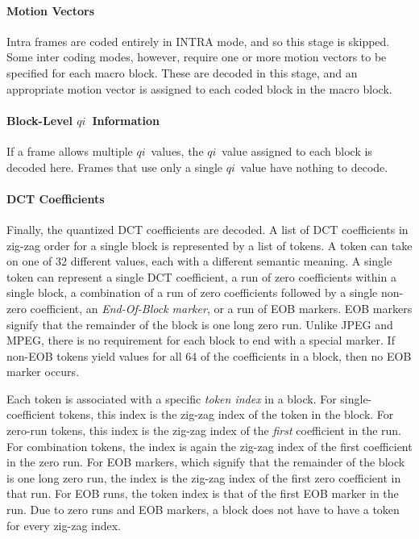 \documentclass[11pt,letterpaper]{book}
\newcommand{\idx}[1]{{\ensuremath{\mathit{#1}}}}
\newcommand{\qi}{\idx{qi}}
\newcommand{\term}[1]{{\em #1}}
\numberwithin{equation}{chapter}
\numberwithin{figure}{chapter}
\numberwithin{table}{chapter}
\begin{document}
\paragraph{Motion Vectors}

Intra frames are coded entirely in INTRA mode, and so this stage is skipped.
Some inter coding modes, however, require one or more motion vectors to be
 specified for each macro block.
These are decoded in this stage, and an appropriate motion vector is assigned
 to each coded block in the macro block.

\paragraph{Block-Level \qi\ Information}

If a frame allows multiple \qi\ values, the \qi\ value assigned to each block
 is decoded here.
Frames that use only a single \qi\ value have nothing to decode.

\paragraph{DCT Coefficients}

Finally, the quantized DCT coefficients are decoded.
A list of DCT coefficients in zig-zag order for a single block is represented
 by a list of tokens.
A token can take on one of 32 different values, each with a different semantic
 meaning.
A single token can represent a single DCT coefficient, a run of zero
 coefficients within a single block, a combination of a run of zero
 coefficients followed by a single non-zero coefficient, an
 \term{End-Of-Block marker}, or a run of EOB markers.
EOB markers signify that the remainder of the block is one long zero run.
Unlike JPEG and MPEG, there is no requirement for each block to end with 
 a special marker.
If non-EOB tokens yield values for all 64 of the coefficients in a block, then
 no EOB marker occurs.

Each token is associated with a specific \term{token index} in a block.
For single-coefficient tokens, this index is the zig-zag index of the token in
 the block.
For zero-run tokens, this index is the zig-zag index of the {\em first}
 coefficient in the run.
For combination tokens, the index is again the zig-zag index of the first
 coefficient in the zero run.
For EOB markers, which signify that the remainder of the block is one long zero
 run, the index is the zig-zag index of the first zero coefficient in that run.
For EOB runs, the token index is that of the first EOB marker in the run.
Due to zero runs and EOB markers, a block does not have to have a token for
 every zig-zag index.
\end{document}
